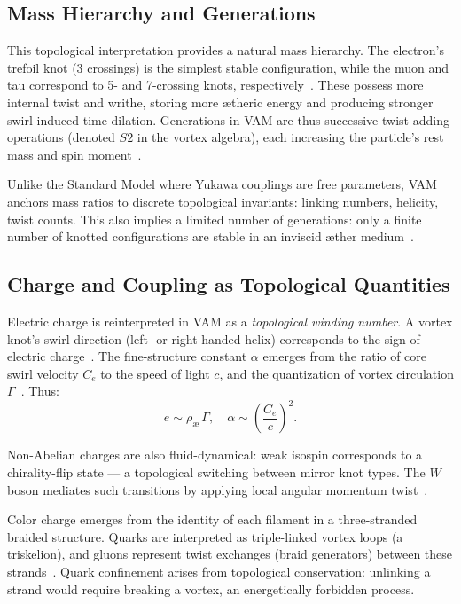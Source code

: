 \subsection*{Mass Hierarchy and Generations}

This topological interpretation provides a natural mass hierarchy. The electron’s trefoil knot (3 crossings) is the simplest stable configuration, while the muon and tau correspond to 5- and 7-crossing knots, respectively~\cite{iskandarani2025vam5}. These possess more internal twist and writhe, storing more ætheric energy and producing stronger swirl-induced time dilation. Generations in VAM are thus successive twist-adding operations (denoted $S2$ in the vortex algebra), each increasing the particle’s rest mass and spin moment~\cite{iskandarani2025vam5}.

Unlike the Standard Model where Yukawa couplings are free parameters, VAM anchors mass ratios to discrete topological invariants: linking numbers, helicity, twist counts. This also implies a limited number of generations: only a finite number of knotted configurations are stable in an inviscid æther medium~\cite{iskandarani2025vam5}.

\subsection*{Charge and Coupling as Topological Quantities}

Electric charge is reinterpreted in VAM as a \emph{topological winding number}. A vortex knot’s swirl direction (left- or right-handed helix) corresponds to the sign of electric charge~\cite{iskandarani2025vam5}. The fine-structure constant $\alpha$ emerges from the ratio of core swirl velocity $C_e$ to the speed of light $c$, and the quantization of vortex circulation $\Gamma$~\cite{iskandarani2025vam5}. Thus:
\[
e \sim \rho_{\text{\ae}}\, \Gamma, \quad \alpha \sim \left(\frac{C_e}{c}\right)^2.
\]

Non-Abelian charges are also fluid-dynamical: weak isospin corresponds to a chirality-flip state — a topological switching between mirror knot types. The $W$ boson mediates such transitions by applying local angular momentum twist~\cite{iskandarani2025vam5}.

Color charge emerges from the identity of each filament in a three-stranded braided structure. Quarks are interpreted as triple-linked vortex loops (a triskelion), and gluons represent twist exchanges (braid generators) between these strands~\cite{iskandarani2025vam5}. Quark confinement arises from topological conservation: unlinking a strand would require breaking a vortex, an energetically forbidden process.

